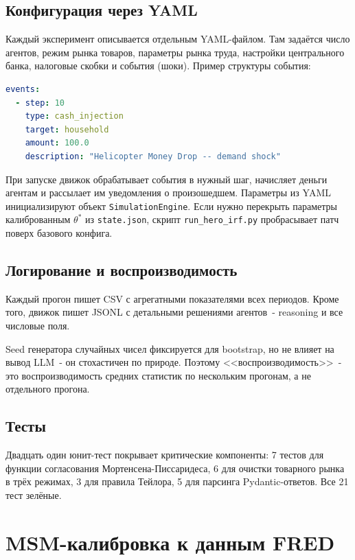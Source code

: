 \documentclass[12pt, a4paper]{article}
\begin{document}
\subsection{Конфигурация через YAML}

Каждый эксперимент описывается отдельным YAML-файлом. Там задаётся число агентов, режим рынка товаров, параметры рынка труда, настройки центрального банка, налоговые скобки и события (шоки). Пример структуры события:

\begin{lstlisting}[language=yaml]
events:
  - step: 10
    type: cash_injection
    target: household
    amount: 100.0
    description: "Helicopter Money Drop -- demand shock"
\end{lstlisting}

При запуске движок обрабатывает события в нужный шаг, начисляет деньги агентам и рассылает им уведомления о произошедшем. Параметры из YAML инициализируют объект \texttt{SimulationEngine}. Если нужно перекрыть параметры калиброванным $\theta^*$ из \texttt{state.json}, скрипт \texttt{run\_hero\_irf.py} пробрасывает патч поверх базового конфига.

\subsection{Логирование и воспроизводимость}

Каждый прогон пишет CSV с агрегатными показателями всех периодов. Кроме того, движок пишет JSONL с детальными решениями агентов~- reasoning и все числовые поля.

Seed генератора случайных чисел фиксируется для bootstrap, но не влияет на вывод LLM~- он стохастичен по природе. Поэтому <<воспроизводимость>>~- это воспроизводимость средних статистик по нескольким прогонам, а не отдельного прогона.

\subsection{Тесты}

Двадцать один юнит-тест покрывает критические компоненты: 7 тестов для функции согласования Мортенсена-Писсаридеса, 6 для очистки товарного рынка в трёх режимах, 3 для правила Тейлора, 5 для парсинга Pydantic-ответов. Все 21 тест зелёные.

\section{MSM-калибровка к данным FRED}
\end{document}

